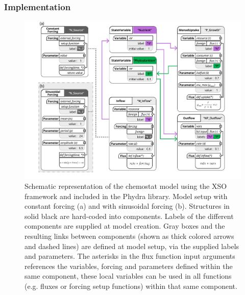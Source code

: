 \documentclass[gmd, manuscript]{copernicus}
\begin{document}
\subsubsection{Implementation}

\begin{figure}[t]
\includegraphics[width=15cm]{Figures/firstdraft_schematics/code_schematics/Chemostat.pdf}
\caption{Schematic representation of the chemostat model using the XSO framework and included in the Phydra library. Model setup with constant forcing (a) and with sinusoidal forcing (b). Structures in solid black are hard-coded into components. Labels of the different components are supplied at model creation. Gray boxes and the resulting links between components (shown as thick colored arrows and dashed lines) are defined at model setup, via the supplied labels and parameters. The asterisks in the flux function input arguments references the variables, forcing and parameters defined within the same component, these local variables can be used in all functions (e.g. fluxes or forcing setup functions) within that same component.}
\label{Figure:CodeSchematics_1}
\end{figure}
\end{document}
